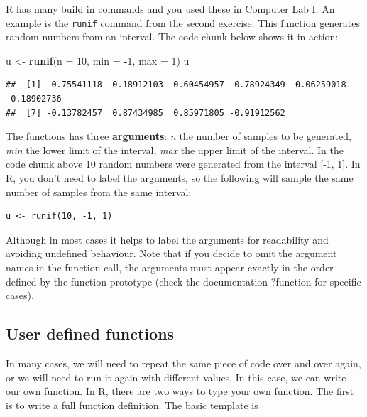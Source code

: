 \documentclass[
]{book}
\newenvironment{Shaded}{\begin{snugshade}}{\end{snugshade}}
\newcommand{\AttributeTok}[1]{\textcolor[rgb]{0.13,0.29,0.53}{#1}}
\newcommand{\DecValTok}[1]{\textcolor[rgb]{0.00,0.00,0.81}{#1}}
\newcommand{\FunctionTok}[1]{\textcolor[rgb]{0.13,0.29,0.53}{\textbf{#1}}}
\newcommand{\NormalTok}[1]{#1}
\newcommand{\OtherTok}[1]{\textcolor[rgb]{0.56,0.35,0.01}{#1}}
\newcommand{\SpecialCharTok}[1]{\textcolor[rgb]{0.81,0.36,0.00}{\textbf{#1}}}
\theoremstyle{definition}
\theoremstyle{definition}
\theoremstyle{definition}
\theoremstyle{definition}
\theoremstyle{remark}
\begin{document}
R has many build in commands and you used these in Computer Lab I. An example is the \texttt{runif} command from the second exercise. This function generates random numbers from an interval. The code chunk below shows it in action:

\begin{Shaded}
\begin{Highlighting}[]
\NormalTok{u }\OtherTok{\textless{}{-}} \FunctionTok{runif}\NormalTok{(}\AttributeTok{n =} \DecValTok{10}\NormalTok{, }\AttributeTok{min =} \SpecialCharTok{{-}}\DecValTok{1}\NormalTok{, }\AttributeTok{max =} \DecValTok{1}\NormalTok{)}
\NormalTok{u}
\end{Highlighting}
\end{Shaded}

\begin{verbatim}
##  [1]  0.75541118  0.18912103  0.60454957  0.78924349  0.06259018 -0.18902736
##  [7] -0.13782457  0.87434985  0.85971805 -0.91912562
\end{verbatim}

The functions has three \textbf{arguments}: \emph{n} the number of samples to be generated, \emph{min} the lower limit of the interval, \emph{max} the upper limit of the interval. In the code chunk above 10 random numbers were generated from the interval {[}-1, 1{]}. In R, you don't need to label the arguments, so the following will sample the same number of samples from the same interval:

\begin{verbatim}
u <- runif(10, -1, 1)
\end{verbatim}

Although in most cases it helps to label the arguments for readability and avoiding undefined behaviour. Note that if you decide to omit the argument names in the function call, the arguments must appear exactly in the order defined by the function prototype (check the documentation ?function for specific cases).

\hypertarget{user-defined-functions}{%
\subsection{User defined functions}\label{user-defined-functions}}

In many cases, we will need to repeat the same piece of code over and over again, or we will need to run it again with different values. In this case, we can write our own function. In R, there are two ways to type your own function. The first is to write a full function definition. The basic template is
\end{document}
